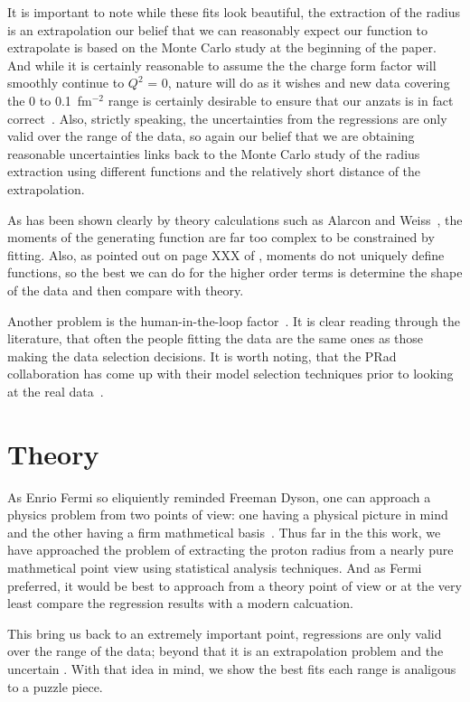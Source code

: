 \documentclass[10pt,aps,prc,twocolumn]{revtex4-1}
\begin{document}
It is important to note while these fits look beautiful, the extraction of the radius is an
extrapolation our belief that we can reasonably expect our function to extrapolate is based
on the Monte Carlo study at the beginning of the paper.    And while it is certainly reasonable
to assume the the charge form factor will smoothly continue to $Q^2$ = 0,
nature will do as it wishes and new data covering the 0 to 0.1~fm$^{-2}$ range is 
certainly desirable to ensure that our anzats is in fact correct~\cite{Gasparian:2014rna,
Peng:2016szv, Mihovilovic:2016rkr}.   
Also, strictly speaking, the
uncertainties from the regressions are only valid over the range of the data, so again our 
belief that we are obtaining reasonable uncertainties links back to the Monte Carlo study of the
radius extraction using different functions and the relatively short distance of the extrapolation.

As has been shown clearly by theory calculations
such as Alarcon and Weiss~\cite{}, the moments of the generating function are far too complex to be constrained
by fitting.  Also, as pointed out on page XXX of \cite{}, moments do not uniquely define functions, so the best
we can do for the higher order terms is determine the shape of the data and then compare with theory.

Another problem is the human-in-the-loop factor~\cite{Daee:2018:UMA:3172944.3172989}.   It is clear 
reading through the literature, that often the people fitting the data are the
same ones as those making the data selection decisions.
It is worth noting, that the PRad collaboration has come up with their model selection techniques
prior to looking at the real data~\cite{Yan:2018bez}.

\section{Theory}

As Enrio Fermi so eliquiently reminded Freeman Dyson, one can approach a physics problem from two points
of view: one having a physical picture in mind and the other having a firm mathmetical basis~\cite{Dyson:2004}.  
Thus far in the this work, we have approached the problem of extracting the proton radius from a nearly pure 
mathmetical point view using statistical analysis techniques.  And as Fermi preferred, it would be best to
approach from a theory point of view or at the very least compare the regression results with a modern
calcuation.

This bring us back to an extremely important point, regressions are only valid over the range of the data;
beyond that it is an extrapolation problem and the uncertain .
With that idea in mind, we show the best fits  each range is analigous to a puzzle piece.
\end{document}
